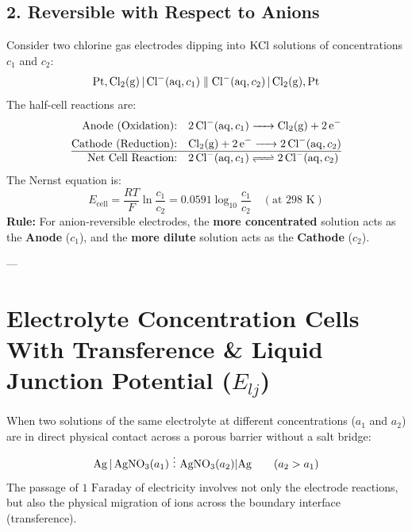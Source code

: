 \subsection{2. Reversible with Respect to Anions}
Consider two chlorine gas electrodes dipping into $\ce{KCl}$ solutions of concentrations $c_1$ and $c_2$:
\begin{equation}
    \ce{Pt, Cl2(g) | Cl^-(aq, } c_1\ce{)} \parallel \ce{Cl^-(aq, } c_2\ce{) | Cl2(g), Pt}
\end{equation}
The half-cell reactions are:
\begin{align}
    \text{Anode (Oxidation):} \quad & \ce{2Cl^-(aq, } c_1\ce{) -> Cl2(g) + 2e^-} \\
    \text{Cathode (Reduction):} \quad & \ce{Cl2(g) + 2e^- -> 2Cl^-(aq, } c_2\ce{)} \\
    \hline
    \text{Net Cell Reaction:} \quad & \ce{2Cl^-(aq, } c_1\ce{) <=> 2Cl^-(aq, } c_2\ce{)}
\end{align}
The Nernst equation is:
\begin{equation}
    \boxed{E_{\text{cell}} = \frac{RT}{F} \ln \frac{c_1}{c_2} = 0.0591 \log_{10} \frac{c_1}{c_2}} \quad (\text{at } 298\text{ K})
\end{equation}
\textbf{Rule:} For anion-reversible electrodes, the \textbf{more concentrated} solution acts as the \textbf{Anode} ($c_1$), and the \textbf{more dilute} solution acts as the \textbf{Cathode} ($c_2$).

---

\section{Electrolyte Concentration Cells With Transference \& Liquid Junction Potential ($E_{lj}$)}

When two solutions of the same electrolyte at different concentrations ($a_1$ and $a_2$) are in direct physical contact across a porous barrier without a salt bridge:
\begin{equation}
    \ce{Ag | AgNO3}(a_1) \ \vdots \ \ce{AgNO3}(a_2) | \ce{Ag} \qquad (a_2 > a_1)
\end{equation}
The passage of $1\text{ Faraday}$ of electricity involves not only the electrode reactions, but also the physical migration of ions across the boundary interface (transference).

